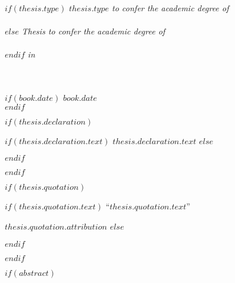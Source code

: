 \begin{titlepage}
\begin{center}
\vfill

\large 
$if(thesis.type)$
\textit{$thesis.type$ to confer the academic degree of\\ \degreename}\\[0.3cm] %
$else$
\textit{Thesis to confer the academic degree of\\ \degreename}\\[0.3cm] %
$endif$
\textit{in}\\[0.4cm]
\textbf{\groupname}\\
\href{$thesis.supervisor.url$}{\deptname}\\[2cm] %

\vfill

$if(book.date)$
{\large $book.date$}\\[4cm] %
$endif$

\vfill
\end{center}
\end{titlepage}


$if(thesis.declaration)$
\begin{declaration}
\addchaptertocentry{\authorshipname} %
$if(thesis.declaration.text)$
$thesis.declaration.text$
$else$

$endif$

\end{declaration}

\cleardoublepage
$endif$

$if(thesis.quotation)$

\vspace*{0.2\textheight}

$if(thesis.quotation.text)$
\noindent``{\itshape $thesis.quotation.text$}''\bigbreak

\hfill $thesis.quotation.attribution$
$else$

$endif$

$endif$

$if(abstract)$

